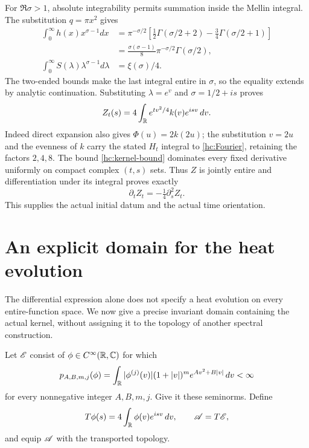 For $\Re\sigma>1$, absolute integrability permits summation inside
the Mellin integral. The substitution $q=\pi x^2$ gives
\begin{align*}
\int_0^\infty h(x)x^{\sigma-1}dx
 &=\pi^{-\sigma/2}
   \left[\tfrac12\Gamma(\sigma/2+2)-\tfrac34\Gamma(\sigma/2+1)\right]\\
 &=\frac{\sigma(\sigma-1)}8\pi^{-\sigma/2}\Gamma(\sigma/2),\\
\int_0^\infty S(\lambda)\lambda^{\sigma-1}d\lambda&=\xi(\sigma)/4.
\end{align*}
The two-ended bounds make the last integral entire in $\sigma$,
so the equality extends by analytic continuation. Substituting
$\lambda=e^v$ and $\sigma=1/2+is$ proves
\begin{equation}
Z_t(s)=4\int_\mathbb R e^{tv^2/4}k(v)e^{isv}\,dv.
\label{hc:Fourier}
\end{equation}
Indeed direct expansion also gives $\Phi(u)=2k(2u)$; the substitution
$v=2u$ and the evenness of $k$ carry the stated $H_t$ integral
to \eqref{hc:Fourier}, retaining the factors $2,4,8$.
The bound \eqref{hc:kernel-bound} dominates every fixed derivative
uniformly on compact complex $(t,s)$ sets. Thus $Z$ is jointly entire
and differentiation under its integral proves exactly
\begin{equation}
\partial_t Z_t=-\tfrac14\partial_s^2 Z_t.
\label{hc:heat}
\end{equation}
This supplies the actual initial datum and the actual time orientation.

\section{An explicit domain for the heat evolution}
The differential expression alone does not specify a heat evolution
on every entire-function space. We now give a precise invariant domain
containing the actual kernel, without assigning it to the topology of
another spectral construction.

\begin{definition}
Let $\mathscr E$ consist of $\phi\in C^\infty(\mathbb R,\mathbb C)$ for which
\[
p_{A,B,m,j}(\phi)=\int_\mathbb R |\phi^{(j)}(v)|(1+|v|)^m
                          e^{Av^2+B|v|}\,dv<\infty
\]
for every nonnegative integer $A,B,m,j$. Give it these seminorms.
Define
\[
T\phi(s)=4\int_\mathbb R\phi(v)e^{isv}\,dv,\qquad \mathscr A=T\mathscr E,
\]
and equip $\mathscr A$ with the transported topology.
\end{definition}


